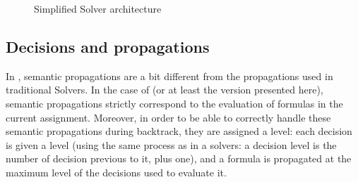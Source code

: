 \documentclass{article}
\begin{document}
\begin{figure}
  \begin{center}
  \end{center}
  \caption{Simplified \mcsat{} Solver architecture}\label{fig:mcsat_flow}
\end{figure}

\subsection{Decisions and propagations}

In \mcsat{}, semantic propagations are a bit different from the propagations
used in traditional \smt{} Solvers. In the case of \mcsat{} (or at least the version presented here),
semantic propagations strictly correspond to the evaluation of formulas in the
current assignment. Moreover, in order to be able to correctly handle these semantic
propagations during backtrack, they are assigned a level: each decision is given a level
(using the same process as in a \sat{} solvers: a decision level is the number of decision
previous to it, plus one), and a formula is propagated at the maximum level of the decisions
used to evaluate it.
\end{document}

